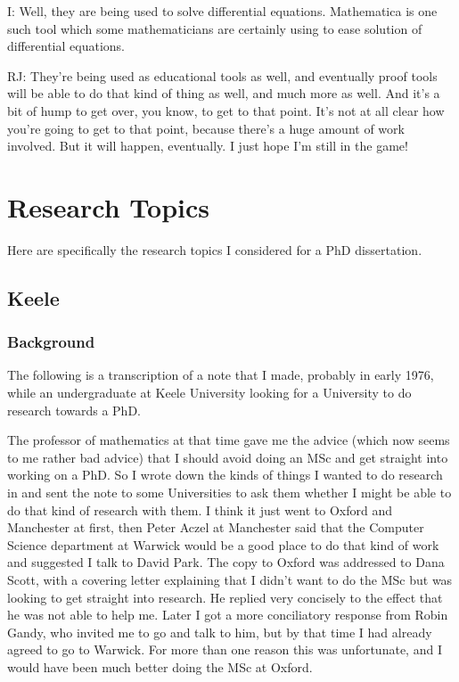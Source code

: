 \documentclass[10pt,titlepage]{book}
\begin{document}
I: Well, they are being used to solve differential equations.
Mathematica is one such tool which some mathematicians are certainly using to ease solution of differential equations.

RJ: They're being used as educational tools as well, and eventually proof tools will be able to do that kind of thing as well, and much more as well.
And it's a bit of hump to get over, you know, to get to that point.
It's not at all clear how you're going to get to that point, because there's a huge amount of work involved.
But it will happen, eventually.
I just hope I'm still in the game!

\appendix

\chapter{Research Topics}\label{ResearchTopics}

Here are specifically the research topics I considered for a PhD dissertation.

\section{Keele}\label{KeeleProposal}

\subsection{Background}

The following is a transcription of a note that I made, probably in early 1976, while an undergraduate at Keele University looking for a University to do research towards a PhD.

The professor of mathematics at that time gave me the advice (which now seems to me rather bad advice) that I should avoid doing an MSc and get straight into working on a PhD.
So I wrote down the kinds of things I wanted to do research in and sent the note to some Universities to ask them whether I might be able to do that kind of research with them.
I think it just went to Oxford and Manchester at first, then Peter Aczel at Manchester said that the Computer Science department at Warwick would be a good place to do that kind of work and suggested I talk to David Park.
The copy to Oxford was addressed to Dana Scott, with a covering letter explaining that I didn't want to do the MSc but was looking to get straight into research.
He replied very concisely to the effect that he was not able to help me.
Later I got a more conciliatory response from Robin Gandy, who invited me to go and talk to him, but by that time I had already agreed to go to Warwick.
For more than one reason this was unfortunate, and I would have been much better doing the MSc at Oxford.
\end{document}
